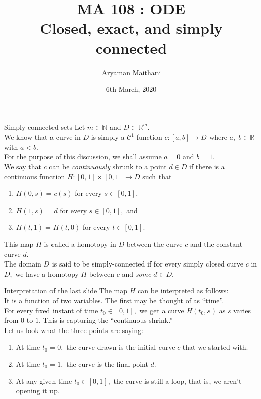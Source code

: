 \documentclass[handout, aspectratio=169]{beamer}
\title{MA 108 : ODE\\ Closed, exact, and simply connected}  %
\author{Aryaman Maithani}
\date[06-03-2019]{6th March, 2020}               %
\institute[IITB]{IIT Bombay}
\begin{document}
\begin{frame}
	\titlepage
\end{frame}
\begin{frame}{Simply connected sets}
	Let $m \in \mathbb{N}$ and $D \subset \mathbb{R}^m.$\\
	We know that a curve in $D$ is simply a $\mathcal{C}^1$ function $c:[a, b]\to D$ where $a,\;b\in\mathbb{R}$ with $a < b.$\\
	For the purpose of this discussion, we shall assume $a = 0$ and $b = 1.$\\
	We say that $c$ can be \emph{continuously} shrunk to a point $d \in D$ if there is a continuous function $H:[0, 1]\times[0, 1]\to D$ such that
	\begin{enumerate} 
		\item $H(0, s) = c(s)$ for every $s \in [0, 1],$
		\item $H(1, s) = d$ for every $s \in [0, 1],$ and
		\item $H(t, 1) = H(t, 0)$ for every $t \in [0, 1].$
	\end{enumerate}
	This map $H$ is called a homotopy in $D$ between the curve $c$ and the constant curve $d.$\\
	The domain $D$ is said to be simply-connected if for every simply closed curve $c$ in $D,$ we have a homotopy $H$ between $c$ and \emph{some} $d \in D.$
\end{frame}
\begin{frame}{Interpretation of the last slide} 
	The map $H$ can be interpreted as follows:\\
	It is a function of two variables. The first may be thought of as ``time''.\\
	For every fixed instant of time $t_0 \in [0, 1],$ we get a curve $H(t_0, s)$ as $s$ varies from $0$ to $1.$ This is capturing the ``continuous shrink.''\\
	Let us look what the three points are saying:
	\begin{enumerate} 
		\item At time $t_0 = 0,$ the curve drawn is the initial curve $c$ that we started with.
		\item At time $t_0 = 1,$ the curve is the final point $d.$
		\item At any given time $t_0 \in [0, 1],$ the curve is still a loop, that is, we aren't opening it up.
	\end{enumerate}
\end{frame}
\end{document}
